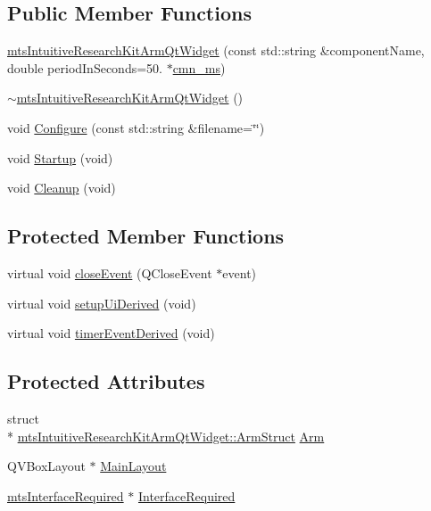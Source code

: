 \subsection*{Public Member Functions}
\begin{DoxyCompactItemize}
\item 
\hyperlink{classmts_intuitive_research_kit_arm_qt_widget_ad60b765537cb643d50744018146e5edd}{mts\-Intuitive\-Research\-Kit\-Arm\-Qt\-Widget} (const std\-::string \&component\-Name, double period\-In\-Seconds=50. $\ast$\hyperlink{cmn_units_8h_aaf4d3f2fafb9b4a95606544b9d876b4a}{cmn\-\_\-ms})
\item 
\hyperlink{classmts_intuitive_research_kit_arm_qt_widget_a858fa4fe6f05dfbfd2e022db969365ff}{$\sim$mts\-Intuitive\-Research\-Kit\-Arm\-Qt\-Widget} ()
\item 
void \hyperlink{classmts_intuitive_research_kit_arm_qt_widget_a6be920b1878620b718a3deb3e24d9260}{Configure} (const std\-::string \&filename=\char`\"{}\char`\"{})
\item 
void \hyperlink{classmts_intuitive_research_kit_arm_qt_widget_ad3fe47e3be5af5ffcefb856804c8578c}{Startup} (void)
\item 
void \hyperlink{classmts_intuitive_research_kit_arm_qt_widget_ae63cd93bba44f06e7d611e2b9a5dd8f7}{Cleanup} (void)
\end{DoxyCompactItemize}
\subsection*{Protected Member Functions}
\begin{DoxyCompactItemize}
\item 
virtual void \hyperlink{classmts_intuitive_research_kit_arm_qt_widget_a647594fbe97d37c4777efb12d6b8a816}{close\-Event} (Q\-Close\-Event $\ast$event)
\item 
virtual void \hyperlink{classmts_intuitive_research_kit_arm_qt_widget_a744ec28944be1e0d81067a29dabf9507}{setup\-Ui\-Derived} (void)
\item 
virtual void \hyperlink{classmts_intuitive_research_kit_arm_qt_widget_a025a13cf8883efb3bfab138a45c22220}{timer\-Event\-Derived} (void)
\end{DoxyCompactItemize}
\subsection*{Protected Attributes}
\begin{DoxyCompactItemize}
\item 
struct \\*
\hyperlink{structmts_intuitive_research_kit_arm_qt_widget_1_1_arm_struct}{mts\-Intuitive\-Research\-Kit\-Arm\-Qt\-Widget\-::\-Arm\-Struct} \hyperlink{classmts_intuitive_research_kit_arm_qt_widget_a8827ac29528271bc9af49e3d767d0a31}{Arm}
\item 
Q\-V\-Box\-Layout $\ast$ \hyperlink{classmts_intuitive_research_kit_arm_qt_widget_aa0e9d8e3a78462e808be3500a481f683}{Main\-Layout}
\item 
\hyperlink{classmts_interface_required}{mts\-Interface\-Required} $\ast$ \hyperlink{classmts_intuitive_research_kit_arm_qt_widget_a3228df35a189577709a4a62eaeaac798}{Interface\-Required}
\end{DoxyCompactItemize}
